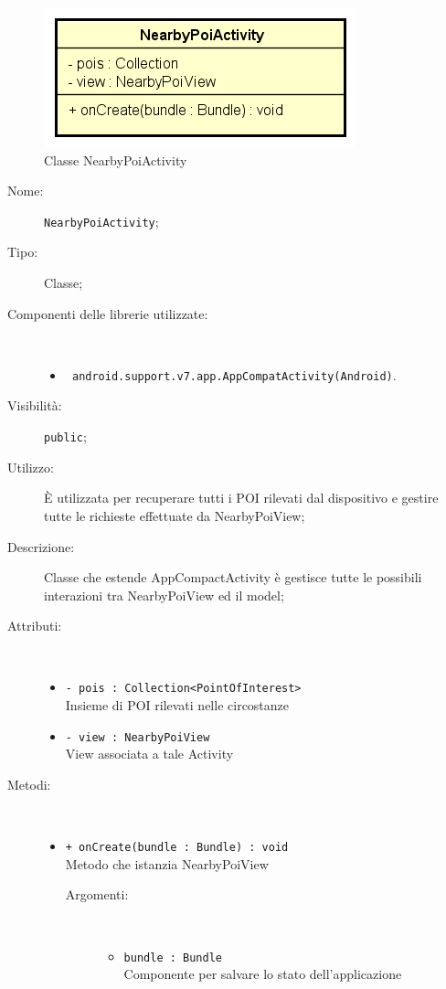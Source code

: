 \documentclass[../DefinizioneDiProdotto.tex]{subfiles}
\begin{document}
    \begin{figure}[H]
        \centering
        \includegraphics{img/NearbyPoiActivity.png}
        \caption{Classe NearbyPoiActivity}\label{fig:presenter::NearbyPoiActivity} 
    \end{figure}
    \begin{description}
\item[Nome:] \texttt{NearbyPoiActivity};
\item[Tipo:] Classe;
\item[Componenti delle librerie utilizzate:] \
\begin{itemize}
\item \texttt{ android.support.v7.app.AppCompatActivity(Android)}.

\end{itemize}
\item[Visibilità:] \texttt{public};
\item[Utilizzo:] È utilizzata per recuperare tutti i POI rilevati dal dispositivo e gestire tutte le richieste effettuate da NearbyPoiView;
\item[Descrizione:] Classe che estende AppCompactActivity è gestisce tutte le possibili interazioni tra NearbyPoiView ed il model;
\item[Attributi:] \
\begin{itemize}
\item \texttt{- pois : Collection<PointOfInterest>}\\
Insieme di POI rilevati nelle circostanze

\item \texttt{- view : NearbyPoiView}\\
View associata a tale Activity

\end{itemize}
\item[Metodi:] \
\begin{itemize}
\item \texttt{+ onCreate(bundle : Bundle) : void}\\
Metodo che istanzia NearbyPoiView
 \begin{description}
\item[Argomenti:] \
\begin{itemize}
\item \texttt{bundle : Bundle}\\
Componente per salvare lo stato dell'applicazione\end{itemize}
\end{description}
\end{itemize}
\end{description}
\end{document}
